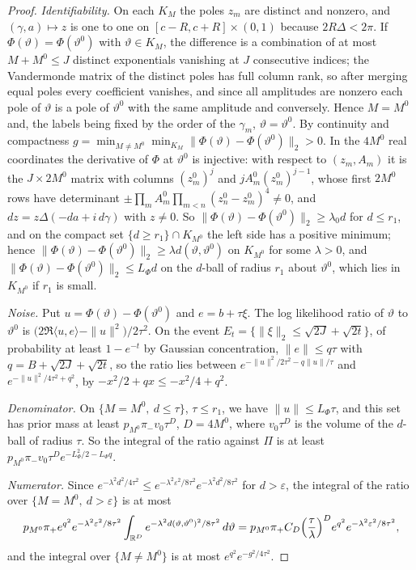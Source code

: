 \begin{proof}
\emph{Identifiability.} On each $K_M$ the poles $z_m$ are distinct and nonzero, and $(\gamma,a)\mapsto z$ is one to one on $[c-R,c+R]\times(0,1)$ because $2R\Delta<2\pi$. If $\Phi(\vartheta)=\Phi(\vartheta^0)$ with $\vartheta\in K_M$, the difference is a combination of at most $M+M^0\le J$ distinct exponentials vanishing at $J$ consecutive indices; the Vandermonde matrix of the distinct poles has full column rank, so after merging equal poles every coefficient vanishes, and since all amplitudes are nonzero each pole of $\vartheta$ is a pole of $\vartheta^0$ with the same amplitude and conversely. Hence $M=M^0$ and, the labels being fixed by the order of the $\gamma_m$, $\vartheta=\vartheta^0$. By continuity and compactness $g=\min_{M\ne M^0}\min_{K_M}\|\Phi(\vartheta)-\Phi(\vartheta^0)\|_2>0$. In the $4M^0$ real coordinates the derivative of $\Phi$ at $\vartheta^0$ is injective: with respect to $(z_m,A_m)$ it is the $J\times2M^0$ matrix with columns $(z^0_m)^j$ and $jA^0_m(z^0_m)^{j-1}$, whose first $2M^0$ rows have determinant $\pm\prod_mA^0_m\prod_{m<n}(z^0_n-z^0_m)^4\ne0$, and $dz=z\Delta(-da+i\,d\gamma)$ with $z\ne0$. So $\|\Phi(\vartheta)-\Phi(\vartheta^0)\|_2\ge\lambda_0d$ for $d\le r_1$, and on the compact set $\{d\ge r_1\}\cap K_{M^0}$ the left side has a positive minimum; hence $\|\Phi(\vartheta)-\Phi(\vartheta^0)\|_2\ge\lambda d(\vartheta,\vartheta^0)$ on $K_{M^0}$ for some $\lambda>0$, and $\|\Phi(\vartheta)-\Phi(\vartheta^0)\|_2\le L_\Phi d$ on the $d$-ball of radius $r_1$ about $\vartheta^0$, which lies in $K_{M^0}$ if $r_1$ is small.

\emph{Noise.} Put $u=\Phi(\vartheta)-\Phi(\vartheta^0)$ and $e=b+\tau\xi$. The log likelihood ratio of $\vartheta$ to $\vartheta^0$ is $\bigl(2\Re\langle u,e\rangle-\|u\|^2\bigr)/2\tau^2$. On the event $E_t=\{\|\xi\|_2\le\sqrt{2J}+\sqrt{2t}\}$, of probability at least $1-e^{-t}$ by Gaussian concentration, $\|e\|\le q\tau$ with $q=B+\sqrt{2J}+\sqrt{2t}$, so the ratio lies between $e^{-\|u\|^2/2\tau^2-q\|u\|/\tau}$ and $e^{-\|u\|^2/4\tau^2+q^2}$, by $-x^2/2+qx\le-x^2/4+q^2$.

\emph{Denominator.} On $\{M=M^0,\ d\le\tau\}$, $\tau\le r_1$, we have $\|u\|\le L_\Phi\tau$, and this set has prior mass at least $p_{M^0}\pi_-v_0\tau^D$, $D=4M^0$, where $v_0\tau^D$ is the volume of the $d$-ball of radius $\tau$. So the integral of the ratio against $\Pi$ is at least $p_{M^0}\pi_-v_0\tau^De^{-L_\Phi^2/2-L_\Phi q}$.

\emph{Numerator.} Since $e^{-\lambda^2d^2/4\tau^2}\le e^{-\lambda^2\varepsilon^2/8\tau^2}e^{-\lambda^2d^2/8\tau^2}$ for $d>\varepsilon$, the integral of the ratio over $\{M=M^0,\ d>\varepsilon\}$ is at most
\[
p_{M^0}\pi_+e^{q^2}e^{-\lambda^2\varepsilon^2/8\tau^2}\int_{\mathbb R^D}e^{-\lambda^2d(\vartheta,\vartheta^0)^2/8\tau^2}\,d\vartheta=p_{M^0}\pi_+C_D\Bigl(\frac\tau\lambda\Bigr)^De^{q^2}e^{-\lambda^2\varepsilon^2/8\tau^2},
\]
and the integral over $\{M\ne M^0\}$ is at most $e^{q^2}e^{-g^2/4\tau^2}$.


\end{proof}
